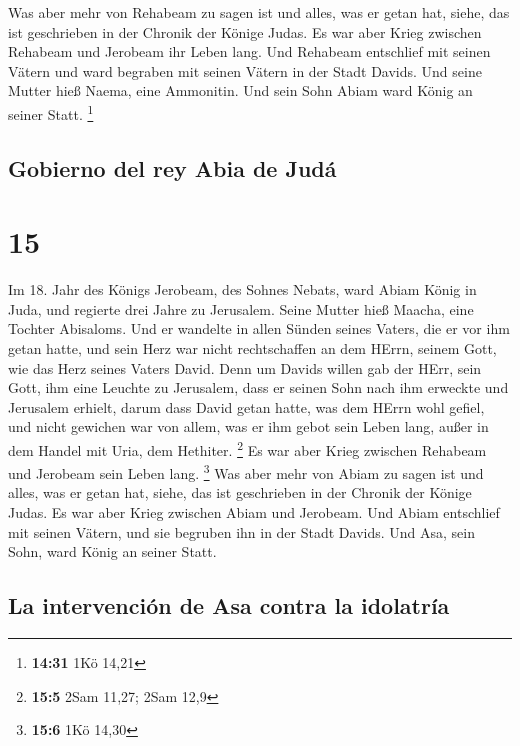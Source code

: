  Was aber mehr von Rehabeam zu sagen ist und alles, was
er getan hat, siehe, das ist geschrieben in der Chronik der Könige
Judas.  Es war aber Krieg zwischen Rehabeam und Jerobeam
ihr Leben lang.  Und Rehabeam entschlief mit seinen
Vätern und ward begraben mit seinen Vätern in der Stadt Davids. Und
seine Mutter hieß Naema, eine Ammonitin. Und sein Sohn Abiam ward König
an seiner Statt. \footnote{\textbf{14:31} 1Kö 14,21}

\hypertarget{gobierno-del-rey-abia-de-juduxe1}{%
\subsection{Gobierno del rey Abia de
Judá}\label{gobierno-del-rey-abia-de-juduxe1}}

\hypertarget{section-14}{%
\section{15}\label{section-14}}

 Im 18. Jahr des Königs Jerobeam, des Sohnes Nebats, ward
Abiam König in Juda,  und regierte drei Jahre zu
Jerusalem. Seine Mutter hieß Maacha, eine Tochter Abisaloms.
 Und er wandelte in allen Sünden seines Vaters, die er vor
ihm getan hatte, und sein Herz war nicht rechtschaffen an dem HErrn,
seinem Gott, wie das Herz seines Vaters David.  Denn um
Davids willen gab der HErr, sein Gott, ihm eine Leuchte zu Jerusalem,
dass er seinen Sohn nach ihm erweckte und Jerusalem erhielt,
 darum dass David getan hatte, was dem HErrn wohl gefiel,
und nicht gewichen war von allem, was er ihm gebot sein Leben lang,
außer in dem Handel mit Uria, dem Hethiter. \footnote{\textbf{15:5} 2Sam
  11,27; 2Sam 12,9}  Es war aber Krieg zwischen Rehabeam
und Jerobeam sein Leben lang. \footnote{\textbf{15:6} 1Kö 14,30}
 Was aber mehr von Abiam zu sagen ist und alles, was er
getan hat, siehe, das ist geschrieben in der Chronik der Könige Judas.
Es war aber Krieg zwischen Abiam und Jerobeam.  Und Abiam
entschlief mit seinen Vätern, und sie begruben ihn in der Stadt Davids.
Und Asa, sein Sohn, ward König an seiner Statt.

\hypertarget{la-intervenciuxf3n-de-asa-contra-la-idolatruxeda}{%
\subsection{La intervención de Asa contra la
idolatría}\label{la-intervenciuxf3n-de-asa-contra-la-idolatruxeda}}

